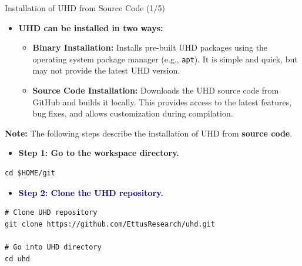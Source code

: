 \begin{frame}[fragile]{Installation of UHD from Source Code (1/5)}

\footnotesize

\begin{itemize}
    \item \textbf{UHD can be installed in two ways:}
    \begin{itemize}
        \item \textbf{Binary Installation:} Installs pre-built UHD packages using the operating system package manager (e.g., \texttt{apt}). It is simple and quick, but may not provide the latest UHD version.

        \item \textbf{Source Code Installation:} Downloads the UHD source code from GitHub and builds it locally. This provides access to the latest features, bug fixes, and allows customization during compilation.
    \end{itemize}
\end{itemize}

\begin{tcolorbox}[
    colback=blue!5,
    colframe=DarkBlue,
    boxrule=0.5pt,
    arc=2pt,
    left=2mm,
    right=2mm,
    top=1mm,
    bottom=1mm
]
\footnotesize
\textbf{Note:} The following steps describe the installation of UHD from \textbf{source code}.
\end{tcolorbox}



\begin{itemize}
    \item \textbf{Step 1: Go to the workspace directory.}
\end{itemize}

\scriptsize
\begin{Verbatim}[xleftmargin=3.8em,breaklines,breaksymbolleft={},breaksymbolright={}]
cd $HOME/git
\end{Verbatim}

\footnotesize

\begin{itemize}
    \item \textbf{\textcolor{DarkBlue}{Step 2: Clone the UHD repository.}}
\end{itemize}

\scriptsize
\begin{Verbatim}[xleftmargin=3.8em,breaklines,breaksymbolleft={},breaksymbolright={}]
# Clone UHD repository
git clone https://github.com/EttusResearch/uhd.git

# Go into UHD directory
cd uhd
\end{Verbatim}

\end{frame}
